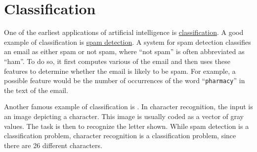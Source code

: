 \chapter{Classification \label{chapter:classification}}
One of the earliest applications of artificial intelligence is
\href{https://en.wikipedia.org/wiki/Statistical_classification}{classification}.  A good
example of classification is
\href{https://en.wikipedia.org/wiki/Anti-spam_techniques#Detecting_spam}{spam detection}.
A system for spam detection classifies an email as either spam or not spam, where ``not spam'' is often
abbreviated as ``ham''.  To do so, it first
computes various   of the email and then uses these features to determine whether
the email is likely to be spam.  For example, a possible feature would be the number of occurrences of the word
``\texttt{pharmacy}'' in the text of the email.

Another famous example of classification is .  In character recognition, the
input is an image depicting a character.  This image is usually coded as a vector of gray values.  The task is
then to recognize the letter shown.  While spam detection is a  classification problem, character
recognition is a  classification problem, since there are 26 different characters.

